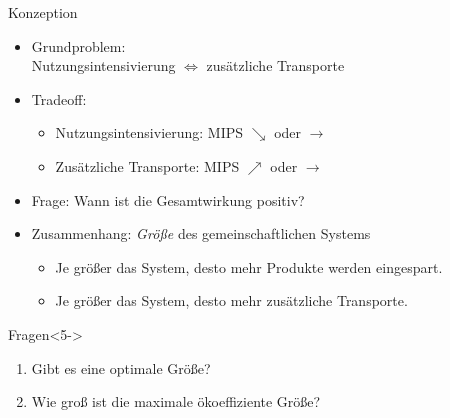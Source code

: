 \documentclass[beamer, xcolor={table,usenames,dvipsnames}]{beamer}
\begin{document}
    \begin{frame}{Konzeption}
    	\begin{itemize}
    		\item<1-> Grundproblem: \\ Nutzungsintensivierung $\Leftrightarrow$ zusätzliche Transporte
    		\item<2-> Tradeoff:
	    		\begin{itemize}
	    			\item Nutzungsintensivierung: MIPS $\searrow$ oder $\rightarrow$
	    			\item Zusätzliche Transporte: MIPS $\nearrow$ oder $\rightarrow$
	    		\end{itemize}
    		\item<3-> Frage: Wann ist die Gesamtwirkung positiv? \\[1em]
    		\item<4-> Zusammenhang: \emph{Größe} des gemeinschaftlichen Systems
	    		\begin{itemize}
	    			\item Je größer das System, desto mehr Produkte werden eingespart.
	    			\item Je größer das System, desto mehr zusätzliche Transporte.
	    		\end{itemize}
    	\end{itemize}
    	\begin{block}{Fragen}<5->
			\begin{enumerate}
			    \item Gibt es eine optimale Größe?
			    \item Wie groß ist die maximale ökoeffiziente Größe?
			\end{enumerate}
    	\end{block}
    \end{frame}
    
\end{document}
